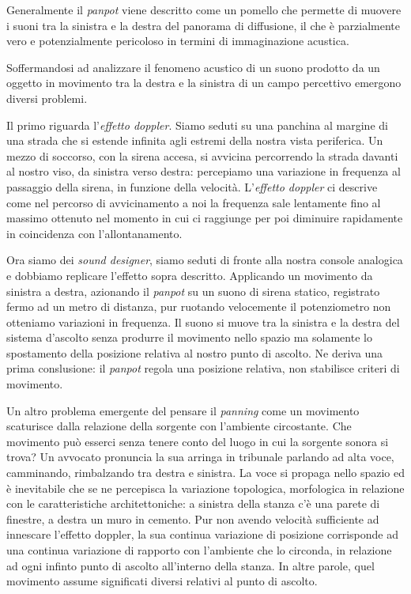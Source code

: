 Generalmente il \emph{panpot} viene descritto come un pomello che permette di
muovere i suoni tra la sinistra e la destra del panorama di diffusione, il che è
parzialmente vero e potenzialmente pericoloso in termini di immaginazione
acustica.

Soffermandosi ad analizzare il fenomeno acustico di un suono prodotto da un
oggetto in movimento tra la destra e la sinistra di un campo percettivo emergono
diversi problemi.

Il primo riguarda l'\emph{effetto doppler}. Siamo seduti su una panchina al
margine di una strada che si estende infinita agli estremi della nostra vista
periferica. Un mezzo di soccorso, con la sirena accesa, si avvicina percorrendo
la strada davanti al nostro viso, da sinistra verso destra: percepiamo
una variazione in frequenza al passaggio della sirena, in funzione della
velocità. L'\emph{effetto doppler} ci descrive come nel percorso di
avvicinamento a noi la frequenza sale lentamente fino al massimo ottenuto nel
momento in cui ci raggiunge per poi diminuire rapidamente in coincidenza con
l'allontanamento.

Ora siamo dei \emph{sound designer}, siamo seduti di fronte alla nostra console
analogica e dobbiamo replicare l'effetto sopra descritto. Applicando un
movimento da sinistra a destra, azionando il \emph{panpot} su un suono di sirena
statico, registrato fermo ad un metro di distanza, pur ruotando velocemente il
potenziometro non otteniamo variazioni in frequenza. Il suono si muove tra la
sinistra e la destra del sistema d'ascolto senza produrre il movimento nello
spazio ma solamente lo spostamento della posizione relativa al nostro punto di
ascolto. Ne deriva una prima conslusione: il \emph{panpot} regola una posizione
relativa, non stabilisce criteri di movimento.

Un altro problema emergente del pensare il \emph{panning} come un movimento
scaturisce dalla relazione della sorgente con l'ambiente circostante. Che
movimento può esserci senza tenere conto del luogo in cui la sorgente sonora si
trova? Un avvocato pronuncia la sua arringa in tribunale parlando ad alta voce,
camminando, rimbalzando tra destra e sinistra. La voce si propaga nello spazio
ed è inevitabile che se ne percepisca la variazione topologica, morfologica in
relazione con le caratteristiche architettoniche: a sinistra della stanza c'è
una parete di finestre, a destra un muro in cemento. Pur non avendo velocità
sufficiente ad innescare l'effetto doppler, la sua continua variazione di
posizione corrisponde ad una continua variazione di rapporto con l'ambiente che
lo circonda, in relazione ad ogni infinto punto di ascolto all'interno della
stanza. In altre parole, quel movimento assume significati diversi relativi al
punto di ascolto.

